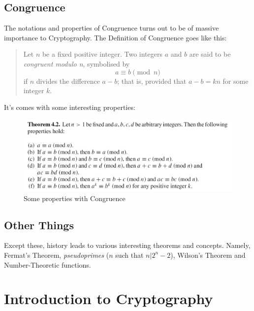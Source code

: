 \documentclass{article}
\begin{document}
\subsection{Congruence}
The notations and properties of Congruence turns out to be of massive importance to Cryptography. The Definition of Congruence goes like this:
\begin{quote}
    Let $n$ be a fixed positive integer. Two integers $a$ and $b$ are said to be {\it congruent modulo n}, symbolised by
    \begin{equation*}
        a \equiv b \pmod n
    \end{equation*}
    if $n$ divides the difference $a-b$; that is, provided that $a-b = kn$ for some integer $k$.
\end{quote}
It's comes with some interesting properties:
\begin{figure}[h]
    \centering
    \includegraphics[width=\textwidth]{cong_prop.png}
    \caption{Some properties with Congruence \cite{cong_prop}}
    \label{fig:cong_prop}
\end{figure}

\subsection{Other Things}
Except these, history leads to various interesting theorems and concepts. Namely, Fermat's Theorem, {\it pseudoprimes} ($n$ such that $n |2^n-2$), Wilson's Theorem and Number-Theoretic functions.

\section{Introduction to Cryptography}
\end{document}
